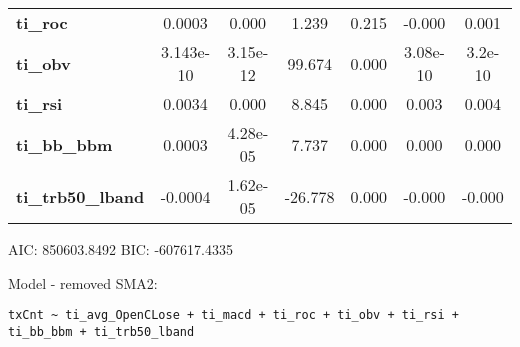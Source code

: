 \begin{center}
\begin{tabular}{lcccccc}
\textbf{ti\_roc}            &       0.0003  &        0.000     &     1.239  &         0.215        &       -0.000    &        0.001     \\
\textbf{ti\_obv}            &    3.143e-10  &     3.15e-12     &    99.674  &         0.000        &     3.08e-10    &      3.2e-10     \\
\textbf{ti\_rsi}            &       0.0034  &        0.000     &     8.845  &         0.000        &        0.003    &        0.004     \\
\textbf{ti\_bb\_bbm}        &       0.0003  &     4.28e-05     &     7.737  &         0.000        &        0.000    &        0.000     \\
\textbf{ti\_trb50\_lband}   &      -0.0004  &     1.62e-05     &   -26.778  &         0.000        &       -0.000    &       -0.000     \\
\bottomrule
\end{tabular}
\end{center}

AIC: 850603.8492 BIC: -607617.4335

Model - removed SMA2: \begin{verbatim}txCnt ~ ti_avg_OpenCLose + ti_macd + ti_roc + ti_obv + ti_rsi + ti_bb_bbm + ti_trb50_lband\end{verbatim}

